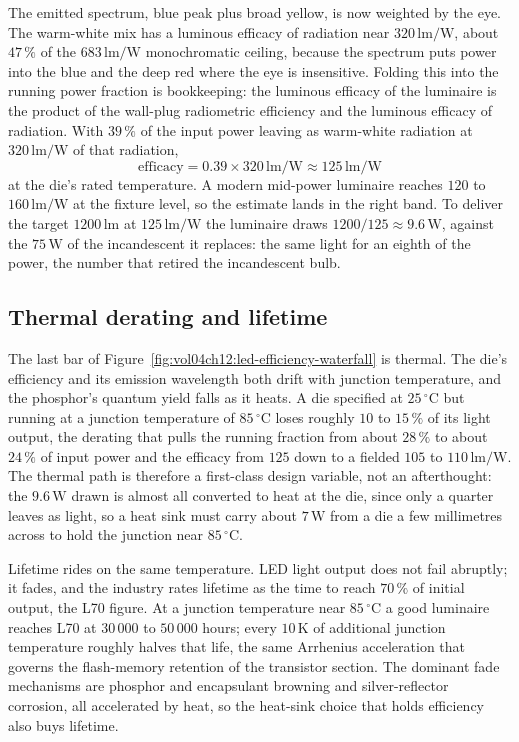 The emitted spectrum, blue peak plus broad yellow, is now weighted by the
eye. The warm-white mix has a luminous efficacy of radiation near
$320\,\si{\lumen\per\watt}$, about $47\,\%$ of the $683\,\si{\lumen\per
\watt}$ monochromatic ceiling, because the spectrum puts power into the
blue and the deep red where the eye is insensitive. Folding this into the
running power fraction is bookkeeping: the luminous efficacy of the
luminaire is the product of the wall-plug radiometric efficiency and the
luminous efficacy of radiation. With $39\,\%$ of the input power leaving
as warm-white radiation at $320\,\si{\lumen\per\watt}$ of that radiation,
\[
\text{efficacy} = 0.39 \times 320\,\si{\lumen\per\watt}
\approx 125\,\si{\lumen\per\watt}
\]
at the die's rated temperature. A modern mid-power luminaire reaches
$120$ to $160\,\si{\lumen\per\watt}$ at the fixture level, so the estimate
lands in the right band. To deliver the target $1200\,\si{\lumen}$ at
$125\,\si{\lumen\per\watt}$ the luminaire draws
$1200/125 \approx 9.6\,\si{\watt}$, against the $75\,\si{\watt}$ of the
incandescent it replaces: the same light for an eighth of the power, the
number that retired the incandescent bulb.

\subsection{Thermal derating and lifetime}

The last bar of Figure~\ref{fig:vol04ch12:led-efficiency-waterfall} is
thermal. The die's efficiency and its emission wavelength both drift with
junction temperature, and the phosphor's quantum yield falls as it heats.
A die specified at $25\,{}^{\circ}\mathrm{C}$ but running at a junction
temperature of $85\,{}^{\circ}\mathrm{C}$ loses roughly $10$ to $15\,\%$
of its light output, the derating that pulls the running fraction from
about $28\,\%$ to about $24\,\%$ of input power and the efficacy from
$125$ down to a fielded $105$ to $110\,\si{\lumen\per\watt}$. The thermal
path is therefore a first-class design variable, not an afterthought: the
$9.6\,\si{\watt}$ drawn is almost all converted to heat at the die, since
only a quarter leaves as light, so a heat sink must carry about
$7\,\si{\watt}$ from a die a few millimetres across to hold the junction
near $85\,{}^{\circ}\mathrm{C}$.

Lifetime rides on the same temperature. LED light output does not fail
abruptly; it fades, and the industry rates lifetime as the time to reach
$70\,\%$ of initial output, the L70 figure. At a junction temperature near
$85\,{}^{\circ}\mathrm{C}$ a good luminaire reaches L70 at $30\,000$ to
$50\,000$ hours; every $10\,\si{\kelvin}$ of additional junction
temperature roughly halves that life, the same Arrhenius acceleration that
governs the flash-memory retention of the transistor section. The
dominant fade mechanisms are phosphor and encapsulant browning and
silver-reflector corrosion, all accelerated by heat, so the heat-sink
choice that holds efficiency also buys lifetime.

